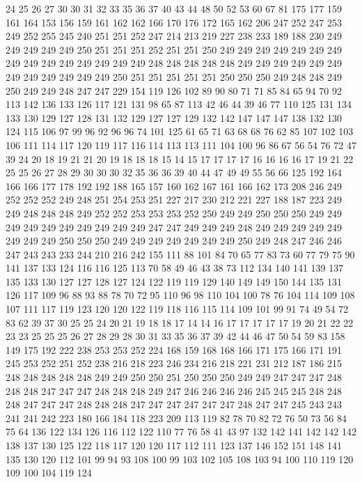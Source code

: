 24 25 26 27 30 30 31 32 33 35 36 37 40 43 44 48 50 52 53 60
67 81 175 177 159 161 164 153 156 159 161 162 162 166 170 176 172 165 162 206
247 252 247 253 249 252 255 245 240 251 251 252 247 214 213 219 227 238 233 189
188 230 249 249 249 249 249 250 251 251 251 252 251 251 250 249 249 249 249 249
249 249 249 249 249 249 249 249 249 249 248 248 248 248 248 249 249 249 249 249
249 249 249 249 249 249 249 250 251 251 251 251 251 250 250 250 249 248 248 249
250 249 249 248 247 247 229 154 119 126 102 89 90 80 71 71 85 84 65 94
70 92 113 142 136 133 126 117 121 131 98 65 87 113 42 46 44 39 46 77
110 125 131 134 133 130 129 127 128 131 132 129 127 127 129 132 142 147 147 147
138 132 130 124 115 106 97 99 96 92 96 96 74 101 125 61 65 71 63 68
68 76 62 85 107 102 103 106 111 114 117 120 119 117 116 114 113 113 111 104
100 96 86 67 56 54 76 72 47 39 24 20 18 19 21 21 20 19 18 18
18 15 14 15 17 17 17 17 16 16 16 16 17 19 21 22 25 25 26 27
28 29 30 30 30 32 35 36 36 39 40 44 47 49 49 55 56 66 125 192
164 166 166 177 178 192 192 188 165 157 160 162 167 161 166 162 173 208 246 249
252 252 252 249 248 251 254 253 251 227 217 230 212 221 227 188 187 223 249 249
248 248 248 249 252 252 253 253 253 252 250 249 249 250 250 250 249 249 249 249
249 249 249 249 249 249 247 247 249 249 249 248 249 249 249 249 249 249 249 249
250 250 250 249 249 249 249 249 249 249 250 249 248 247 246 246 247 243 243 233
244 210 216 242 155 111 88 101 84 70 65 77 83 73 60 77 79 75 90 141
137 133 124 116 116 125 113 70 58 49 46 43 38 73 112 134 140 141 139 137
135 133 130 127 127 128 127 124 122 119 119 129 140 149 149 150 144 135 131 126
117 109 96 88 93 88 78 70 72 95 110 96 98 110 104 100 78 76 104 114
109 108 107 111 117 119 123 120 120 122 119 118 116 115 114 109 101 99 91 74
49 54 72 83 62 39 37 30 25 25 24 20 21 19 18 18 17 14 14 16
17 17 17 17 17 19 20 21 22 22 23 23 25 25 25 26 27 28 29 28
30 31 33 35 36 37 39 42 44 46 47 50 54 59 83 158 149 175 192 222
238 253 253 252 224 168 159 168 168 166 171 175 166 171 191 245 253 252 251 252
238 216 218 223 246 234 216 218 221 231 212 187 186 215 248 248 248 248 248 249
249 250 250 251 250 250 250 249 249 247 247 247 248 248 248 247 247 247 248 248
248 249 247 246 246 246 246 245 245 245 248 248 248 247 247 247 248 248 248 247
247 247 247 247 247 248 247 247 245 243 243 241 241 242 223 180 166 184 118 223
209 113 119 82 78 70 82 72 76 50 73 56 84 75 64 136 122 134 126 116
112 122 110 77 76 58 41 43 97 132 142 141 142 142 142 138 137 130 125 122
118 117 120 120 117 112 111 123 137 146 152 151 148 141 135 130 120 112 101 99
94 93 108 100 99 103 102 105 108 103 94 100 110 119 120 109 100 104 119 124
